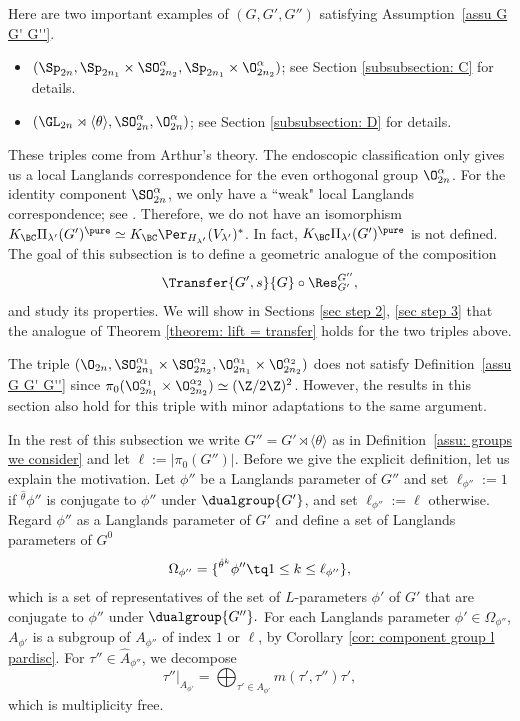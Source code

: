 \documentclass[11pt,letterpaper]{amsart}
\numberwithin{equation}{section}
\begin{document}
Here are two important examples of $(G,G',G'')$ satisfying Assumption~\ref{assu G G' G''}.
\begin{itemize}
 \item $(\Sp_{2n}, \Sp_{2n_1}\times \SO_{2n_2}^{\alpha}, \Sp_{2n_1}\times \O_{2n_2}^{\alpha})$; see Section \ref{subsubsection: C} for details.
    \item $(\GL_{2n}\rtimes \langle \theta \rangle, \SO_{2n}^{\alpha}, \O_{2n}^{\alpha})$; see Section \ref{subsubsection: D} for details.
\end{itemize}
These triples come from Arthur's theory. The endoscopic classification only gives us a local Langlands correspondence for the even orthogonal group $ \O_{2n}^{\alpha}$. For the identity component $\SO_{2n}^{\alpha}$, we only have a ``weak" local Langlands correspondence; see \cite{AG17}. Therefore, we do not have an isomorphism $ K_{\BC}\Pi_{\lambda'}(G')^\pure\simeq K_{\BC} \Per_{H_{\lambda'}}(V_{\lambda'})^{\ast}$. In fact, $K_{\BC}\Pi_{\lambda'}(G')^\pure$ is not defined. The goal of this subsection is to define a geometric analogue of the composition
\[ \Transfer{G',s}{G} \circ \Res^{G''}_{G'},\]
and study its properties.
We will show in Sections \ref{sec step 2}, \ref{sec step 3} that the analogue of Theorem \ref{theorem: lift = transfer} holds for the two triples above.
\begin{remark}
    The triple $(\O_{2n}, \SO_{2n_1}^{\alpha_1}\times \SO_{2n_2}^{\alpha_2}, \O_{2n_1}^{\alpha_1}\times \O_{2n_2}^{\alpha_2} )$ does not satisfy Definition~\ref{assu G G' G''} since $\pi_0( \O_{2n_1}^{\alpha_1}\times \O_{2n_2}^{\alpha_2})\simeq (\Z/2\Z)^2$. However, the results in this section also hold for this triple with minor adaptations to the same argument.
\end{remark}

In the rest of this subsection we write $G''= G' \rtimes \langle \theta \rangle$ as in Definition~\ref{assu: groups we consider} and let $\ell:= |\pi_0(G'')|$.
Before we give the explicit definition, let us explain the motivation. Let $\phi''$ be a Langlands parameter of $G''$ and set $\ell_{\phi''}:=1$ if ${}^{\hat{\theta}}\phi''$ is conjugate to $\phi''$ under $\dualgroup{G'}$, and set $\ell_{\phi''}:=\ell$ otherwise. Regard $\phi''$ as a Langlands parameter of $G'$ and define a set of Langlands parameters of $G^0$
\begin{align}\label{eq def Omega phi''}
    \Omega_{\phi''}=\{{}^{\hat{\theta}^k}\phi'' \tq 1\leq k \leq \ell_{\phi''} \},
\end{align}
which is a set of representatives of the set of $L$-parameters $\phi'$ of $G'$ that are conjugate to $\phi''$ under $\dualgroup{G''}.$ For each Langlands parameter $\phi' \in \Omega_{\phi''}$,
$A_{\phi'}$ is a subgroup of $A_{\phi''}$ of index $1$ or $\ell$, by Corollary \ref{cor: component group  l pardisc}. For $\tau'' \in \widehat{A}_{\phi''}$, we  decompose
\[ \tau''|_{A_{\phi'}}= \bigoplus_{\tau' \in A_{\phi'}} m(\tau',\tau'') \tau', \]
which is multiplicity free.
\end{document}
